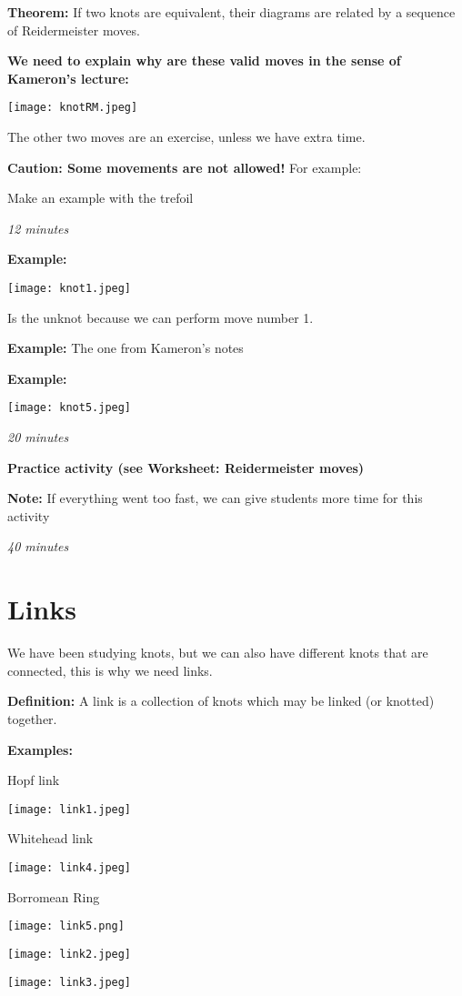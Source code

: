\documentclass[12pt,letterpaper]{article}
\begin{document}
	    \textbf{Theorem:} If two knots are equivalent, their diagrams are related by a sequence of Reidermeister moves.
	    
	    
	    \textbf{We need to explain why are these valid moves in the sense of Kameron's lecture:}
	    
	    \texttt{[image: knotRM.jpeg]}
	    
	    The other two moves are an exercise, unless we have extra time.
	    
	    \textbf{Caution: Some movements are not allowed!} For example:
	    
	    Make an example with the trefoil
	    
	    \textit{12 minutes}
	    
	    \textbf{Example:}  
	    
	    \begin{center}
	        \texttt{[image: knot1.jpeg]}
	    \end{center}
	    
	    Is the unknot because we can perform move number 1.
	    
	    
	    \textbf{Example:} The one from Kameron's notes
	    
	    \textbf{Example:}
	    \begin{center}
	        \texttt{[image: knot5.jpeg]}
	    \end{center}
	    
	    \textit{20 minutes}
	    
	    \textbf{Practice activity (see Worksheet: Reidermeister moves)}
	    
	    \textbf{Note:} If everything went too fast, we can give students more time for this activity
	     
	    \textit{40 minutes}
	    
	    \newpage
	    \section{Links}
	    
	    We have been studying knots, but we can also have different knots that are connected, this is why we need links. 
	    
	    \textbf{Definition:} A link is a collection of knots which may be linked (or knotted) together.
	    
	    \textbf{Examples:}
	    
	    \begin{center}
	    Hopf link
	    
	        \texttt{[image: link1.jpeg]}
	        
	   Whitehead link
	   
	        \texttt{[image: link4.jpeg]}
	        
        Borromean Ring
        
        \texttt{[image: link5.png]}
        
        
	        \texttt{[image: link2.jpeg]}
	        
	        \texttt{[image: link3.jpeg]}
	    \end{center}
	    
\end{document}
